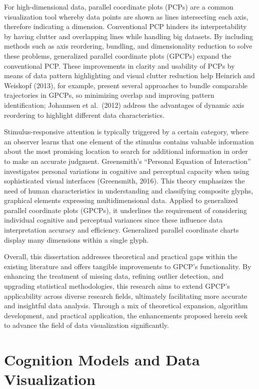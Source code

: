 \documentclass[print]{nuthesis}
\begin{document}
For high-dimensional data, parallel coordinate plots (PCPs) are a common visualization tool whereby data points are shown as lines intersecting each axis, therefore indicating a dimension.
Conventional PCP hinders its interpretability by having clutter and overlapping lines while handling big datasets. By including methods such as axis reordering, bundling, and dimensionality reduction to solve these problems, generalized parallel coordinate plots (GPCPs) expand the conventional PCP.
These improvements in clarity and usability of PCPs by means of data pattern highlighting and visual clutter reduction help Heinrich and Weiskopf (2013), for example, present several approaches to bundle comparable trajectories in GPCPs, so minimizing overlap and improving pattern identification; Johannsen et al.~(2012) address the advantages of dynamic axis reordering to highlight different data characteristics.

Stimulus-responsive attention is typically triggered by a certain category, where an observer learns that one element of the stimulus contains valuable information about the most promising location to search for additional information in order to make an accurate judgment.
Greensmith's ``Personal Equation of Interaction'' investigates personal variations in cognitive and perceptual capacity when using sophisticated visual interfaces (Greensmith, 2016).
This theory emphasizes the need of human characteristics in understanding and classifying composite glyphs, graphical elements expressing multidimensional data.
Applied to generalized parallel coordinate plots (GPCPs), it underlines the requirement of considering individual cognitive and perceptual variances since these influence data interpretation accuracy and efficiency. Generalized parallel coordinate charts display many dimensions within a single glyph.

Overall, this dissertation addresses theoretical and practical gaps within the existing literature and offers tangible improvements to GPCP's functionality.
By enhancing the treatment of missing data, refining outlier detection, and upgrading statistical methodologies, this research aims to extend GPCP's applicability across diverse research fields, ultimately facilitating more accurate and insightful data analysis.
Through a mix of theoretical expansion, algorithm development, and practical application, the enhancements proposed herein seek to advance the field of data visualization significantly.

\hypertarget{cognition-models-and-data-visualization}{%
\section{Cognition Models and Data Visualization}\label{cognition-models-and-data-visualization}}
\end{document}
